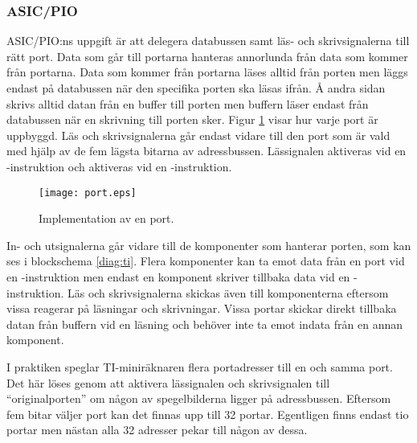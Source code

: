 \documentclass[main.tex]{subfiles}
\begin{document}
\subsubsection{ASIC/PIO}
ASIC/PIO:ns uppgift är att delegera databussen samt läs- och skrivsignalerna
till rätt port. Data som går till portarna hanteras annorlunda från data som
kommer från portarna. Data som kommer från portarna läses alltid från porten
men läggs endast på databussen när den specifika porten ska läsas ifrån. Å
andra sidan skrivs alltid datan från en buffer till porten men buffern läser
endast från databussen när en skrivning till porten sker. Figur \ref{fig:port}
visar hur varje port är uppbyggd. Läs och skrivsignalerna går endast vidare
till den port som är vald med hjälp av de fem lägsta bitarna av adressbussen.
Lässignalen  aktiveras vid en -instruktion och 
aktiveras vid en -instruktion. 
\begin{figure}[b]
    \centering
    \texttt{[image: port.eps]}
    \caption{Implementation av en port.}
    \label{fig:port}
\end{figure}

In- och utsignalerna går vidare till de komponenter som hanterar porten, som
kan ses i blockschema \ref{diag:ti}. Flera komponenter kan ta emot data från en
port vid en -instruktion men endast en komponent skriver tillbaka
data vid en -instruktion. Läs och skrivsignalerna skickas även till
komponenterna eftersom vissa reagerar på läsningar och skrivningar. Vissa
portar skickar direkt tillbaka datan från buffern vid en läsning och behöver
inte ta emot indata från en annan komponent.

I praktiken speglar TI-miniräknaren flera portadresser till en och samma port.
Det här löses genom att aktivera lässignalen och skrivsignalen till
``originalporten'' om någon av spegelbilderna ligger på adressbussen. Eftersom
fem bitar väljer port kan det finnas upp till 32 portar. Egentligen finns
endast tio portar men nästan alla 32 adresser pekar till någon av dessa.
\end{document}
